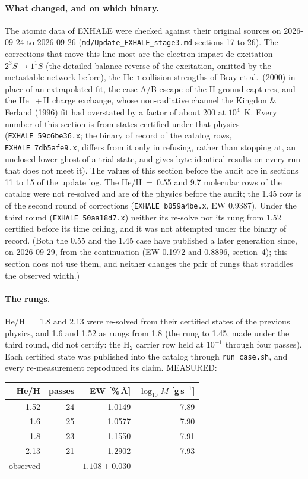 \documentclass[11pt]{my_memo}
\begin{document}
\paragraph{What changed, and on which binary.} The atomic data of EXHALE
were checked against their original sources on 2026-09-24 to 2026-09-26
(\texttt{md/Update\_EXHALE\_stage3.md} sections 17 to 26). The corrections
that move this line most are the electron-impact de-excitation
$2^3S\to1^1S$ (the detailed-balance reverse of the excitation, omitted by
the metastable network before), the He~\textsc{i} collision strengths of
Bray et al.\ (2000) in place of an extrapolated fit, the case-A/B escape of
the H ground captures, and the He$^+$\,+\,H charge exchange, whose
non-radiative channel the Kingdon \& Ferland (1996) fit had overstated by a
factor of about 200 at $10^4$~K. Every number of this section is from
states certified under that physics (\texttt{EXHALE\_59c6be36.x}; the binary
of record of the catalog rows, \texttt{EXHALE\_7db5afe9.x}, differs from it
only in refusing, rather than stopping at, an unclosed lower ghost of a
trial state, and gives byte-identical results on every run that does not
meet it). The values of this section before the audit are in sections 11
to 15 of the update log. The He/H~=~0.55 and 9.7 molecular rows of the
catalog were not re-solved and are of the physics before the audit; the
1.45 row is of the second round of corrections (\texttt{EXHALE\_b059a4be.x},
EW 0.9387). Under the third round (\texttt{EXHALE\_50aa18d7.x}) neither its
re-solve nor its rung from 1.52 certified before its time ceiling, and it
was not attempted under the binary of record. (Both the 0.55 and the 1.45
case have published a later generation since, on 2026-09-29, from the
continuation (EW 0.1972 and 0.8896, section~4); this section does not use
them, and neither changes the pair of rungs that straddles the observed
width.)

\paragraph{The rungs.} He/H~=~1.8 and 2.13 were re-solved from their
certified states of the previous physics, and 1.6 and 1.52 as rungs from
1.8 (the rung to 1.45, made under the third round, did not certify: the H$_2$ carrier row held at
$10^{-1}$ through four passes). Each certified state was published into
the catalog through \texttt{run\_case.sh}, and every re-measurement
reproduced its claim. MEASURED:

\begin{center}
\footnotesize
\begin{tabular}{@{}r r r r@{}}
\toprule
He/H & passes & EW [\%\,\AA] & $\log_{10}\dot M$ [g\,s$^{-1}$]\\
\midrule
1.52 & 24 & 1.0149 & 7.89\\
1.6 & 25 & 1.0577 & 7.90\\
1.8 & 23 & 1.1550 & 7.91\\
2.13 & 21 & 1.2902 & 7.93\\
\midrule
observed & & $1.108\pm0.030$ & \\
\bottomrule
\end{tabular}
\end{center}
\end{document}
